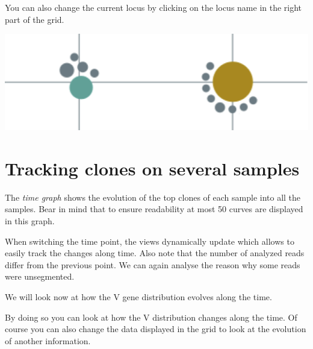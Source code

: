 \documentclass[10pt]{article}
\begin{document}
You can also change the current locus by clicking on the locus name in the
right part of the grid.



\bigskip

\bigskip

\centerline{\includegraphics[width=.5\textwidth]{./grid-1}}

\newpage



\section{Tracking clones on several samples}

\label{sec:tracking}

The \textit{time graph} shows the evolution of the top clones of each sample into all the samples.
Bear in mind that to ensure readability at most 50 curves are displayed in this graph.



When switching the time point, the views dynamically update which allows to
easily track the changes along time. Also note that the number of analyzed
reads differ from the previous point. We can again analyse the reason why some
reads were unsegmented.

\bigskip

We will look now at how the V gene distribution evolves along the time.

By doing so you can look at how the V distribution changes along the time.
Of course you can also change the data displayed in the grid to look at
the evolution of another information.
\end{document}
